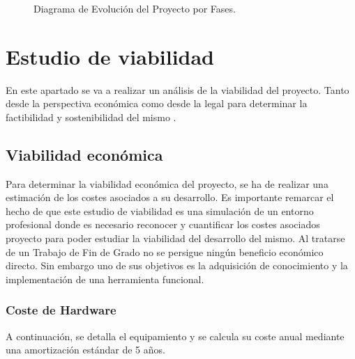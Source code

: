 \begin{figure}[H]
{
    } %
    \caption{Diagrama de Evolución del Proyecto por Fases.}
    \label{fig:diagrama_fases_tikz}
\end{figure}



 



\section{Estudio de viabilidad}
En este apartado se va a realizar un análisis de la viabilidad del proyecto.  Tanto  desde la perspectiva económica como  desde la legal para determinar la factibilidad y sostenibilidad del mismo .

\subsection{Viabilidad económica}
Para determinar la viabilidad económica del proyecto, se ha de realizar una estimación de los costes asociados a su desarrollo. Es importante remarcar el hecho de que este estudio de viabilidad es una simulación de un entorno profesional donde es necesario reconocer y cuantificar los costes asociados proyecto para poder estudiar la viabilidad del desarrollo del mismo.
Al tratarse de un Trabajo de Fin de Grado no se persigue ningún beneficio económico directo. Sin embargo uno de sus objetivos es la adquisición de conocimiento y la implementación de una herramienta funcional.

\subsubsection{Coste de Hardware}
A continuación, se detalla el equipamiento y se calcula su coste anual mediante una amortización estándar de 5 años.

